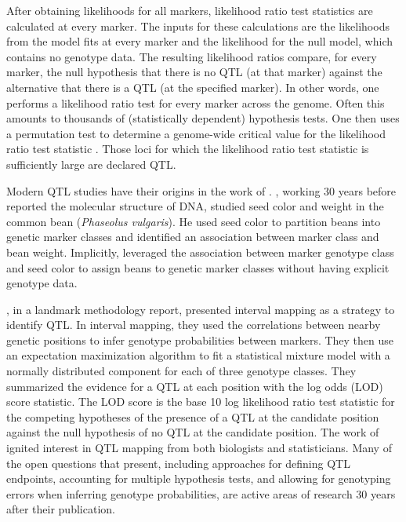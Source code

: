 \documentclass[oneside]{book}\usepackage[]{graphicx}\usepackage[]{color}
\begin{document}
After obtaining likelihoods for all markers, likelihood ratio test statistics are calculated
at every marker. The inputs for these calculations are the likelihoods from the model fits at
every marker and the likelihood for the null model, which contains no genotype data.
The resulting likelihood ratios compare, for every marker, the null hypothesis that there is no 
QTL (at that marker) against the alternative that there is a QTL (at the specified marker).
In other words, one performs a likelihood ratio test for every marker across the genome.
Often this amounts to thousands of (statistically dependent) hypothesis tests.
One then uses a permutation test to determine a genome-wide critical value
for the likelihood ratio test statistic \citep{churchill1994empirical}.
Those loci for which the likelihood ratio test statistic is sufficiently large are declared QTL. 


Modern QTL studies have their origins in the work of \citet{sax1923association}.
\citet{sax1923association}, working 30 years before \citet{watson1953molecular} reported
the molecular structure of DNA, studied seed color and weight in the common bean
(\emph{Phaseolus vulgaris}). He used seed color to partition beans into genetic
marker classes and identified an association between marker class and bean weight. Implicitly, \citet{sax1923association} leveraged the association between marker genotype class and seed color to assign beans to genetic marker classes without having explicit genotype data.



\citet{lander1989mapping}, in a landmark methodology report, presented
interval mapping as a strategy to identify QTL. 
In interval mapping, they used the correlations between nearby genetic positions
to infer genotype probabilities between markers.
They then use an expectation maximization algorithm \citep{dempster1977maximum, lander1987construction}
to fit a statistical mixture model with a normally distributed component for each of three genotype classes. 
They summarized the evidence for a QTL at each position with the log odds (LOD) score statistic.
The LOD score is the base 10 log likelihood ratio test statistic for
the competing hypotheses of the presence of a QTL at the candidate position
against the null hypothesis of no QTL at the candidate position.
The work of \citet{lander1989mapping} ignited interest in QTL mapping from
both biologists and statisticians.
Many of the open questions that \citet{lander1989mapping} present, including approaches
for defining QTL endpoints, accounting for multiple hypothesis tests, and
allowing for genotyping errors when inferring genotype probabilities,
are active areas of research 30 years after their publication.
\end{document}
